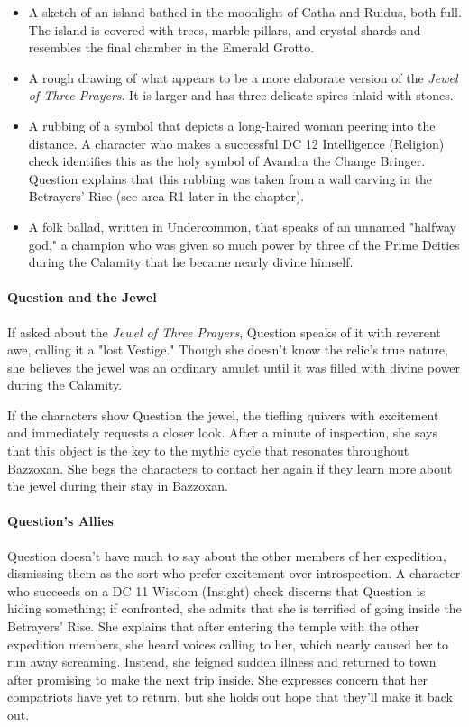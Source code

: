 \documentclass[a4paper, 11pt, bg=full, twocolumn, nooutline]{dndbook}
\begin{document}
\begin{itemize}
\item A sketch of an island bathed in the moonlight of Catha and Ruidus, both full. The island is covered with trees, marble pillars, and crystal shards and resembles the final chamber in the Emerald Grotto.
\item A rough drawing of what appears to be a more elaborate version of the \textit{Jewel of Three Prayers}. It is larger and has three delicate spires inlaid with stones.
\item A rubbing of a symbol that depicts a long-haired woman peering into the distance. A character who makes a successful DC 12 Intelligence (Religion) check identifies this as the holy symbol of Avandra the Change Bringer. Question explains that this rubbing was taken from a wall carving in the Betrayers' Rise (see area R1 later in the chapter).
\item A folk ballad, written in Undercommon, that speaks of an unnamed "halfway god," a champion who was given so much power by three of the Prime Deities during the Calamity that he became nearly divine himself.
\end{itemize}

\paragraph{Question and the Jewel}

If asked about the \textit{Jewel of Three Prayers}, Question speaks of it with reverent awe, calling it a "lost Vestige." Though she doesn't know the relic's true nature, she believes the jewel was an ordinary amulet until it was filled with divine power during the Calamity.

If the characters show Question the jewel, the tiefling quivers with excitement and immediately requests a closer look. After a minute of inspection, she says that this object is the key to the mythic cycle that resonates throughout Bazzoxan. She begs the characters to contact her again if they learn more about the jewel during their stay in Bazzoxan.

\paragraph{Question's Allies}

Question doesn't have much to say about the other members of her expedition, dismissing them as the sort who prefer excitement over introspection. A character who succeeds on a DC 11 Wisdom (Insight) check discerns that Question is hiding something; if confronted, she admits that she is terrified of going inside the Betrayers' Rise. She explains that after entering the temple with the other expedition members, she heard voices calling to her, which nearly caused her to run away screaming. Instead, she feigned sudden illness and returned to town after promising to make the next trip inside. She expresses concern that her compatriots have yet to return, but she holds out hope that they'll make it back out.
\end{document}
